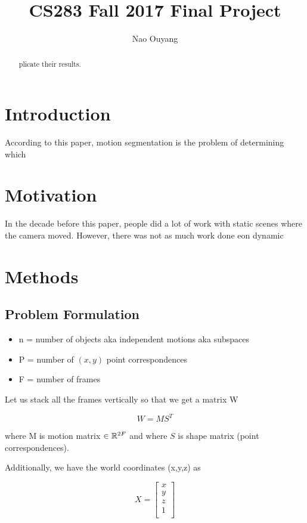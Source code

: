 \documentclass[a4paper]{article}
\title{CS283 Fall 2017 Final Project}
\author{Nao Ouyang}
\begin{document}
\maketitle

\begin{abstract} plicate their results.

\end{abstract}

\section{Introduction}
According to this paper, motion segmentation is the problem of determining which


\section{Motivation}

In the decade before this paper, people did a lot of work with static scenes
where the camera moved. However, there was not as much work done eon dynamic
\section{Methods}


\subsection{Problem Formulation}

\newcommand{\matx}[1]{\mbox{\tt #1}}
\newcommand{\vect}[1]{{\bf #1}}

\begin{itemize}
\item n = number of objects aka independent motions aka subspaces
\item P = number of $(x, y)$ point correspondences
\item F = number of frames
\end{itemize}

Let us stack all the frames vertically so that we get a matrix W

$$W = MS^T$$

where M is motion matrix
$\in \mathbb{R}^{2F \time 4}$
and where $S$ is shape matrix (point correspondences).

Additionally, we have the world coordinates (x,y,z) as

\begin{equation}
X =
\begin{bmatrix}
    x \\
    y \\
    z \\
    1 \\
\end{bmatrix}
\end{equation}
\end{document}
